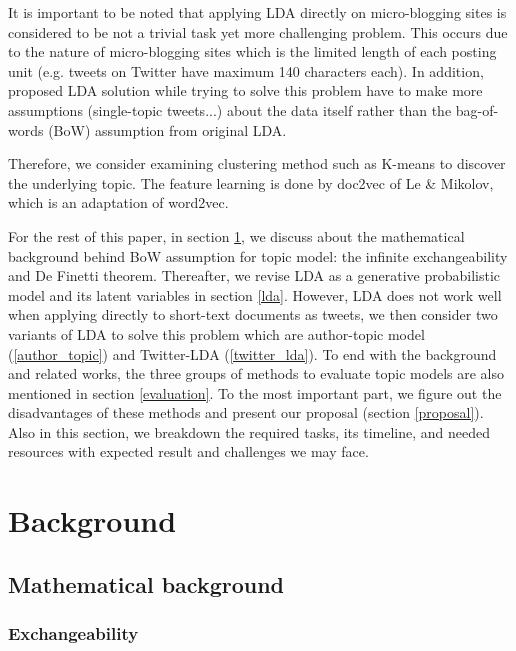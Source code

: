 \documentclass[conference,compsoc]{IEEEtran}
\begin{document}
It is important to be noted that applying LDA directly on micro-blogging sites is considered to be not a trivial task yet more challenging problem. This occurs due to the nature of micro-blogging sites which is the limited length of each posting unit (e.g. tweets on Twitter have maximum 140 characters each). In addition, proposed LDA solution while trying to solve this problem have to make more assumptions (single-topic tweets...)\cite{zhao2011comparing} about the data itself rather than the bag-of-words (BoW) assumption from original LDA.

Therefore, we consider examining clustering method such as K-means to discover the underlying topic. The feature learning is done by doc2vec of Le \& Mikolov\cite{le2014distributed}, which is an adaptation of word2vec\cite{mikolov2013distributed}.


For the rest of this paper, in section \ref{background}, we discuss about the mathematical background behind BoW assumption for topic model: the infinite exchangeability and De Finetti theorem. Thereafter, we revise LDA as a generative probabilistic model and its latent variables in section \ref{lda}. However, LDA does not work well when applying directly to short-text documents as tweets, we then consider two variants of LDA to solve this problem which are author-topic model (\ref{author_topic}) and Twitter-LDA (\ref{twitter_lda}). To end with the background and related works, the three groups of methods to evaluate topic models are also mentioned in section \ref{evaluation}. To the most important part, we figure out the disadvantages of these methods and present our proposal (section \ref{proposal}). Also in this section, we breakdown the required tasks, its timeline, and needed resources with expected result and challenges we may face.


\section{Background} \label{background}


\subsection{Mathematical background} \label{math}

\subsubsection{Exchangeability}
\end{document}
